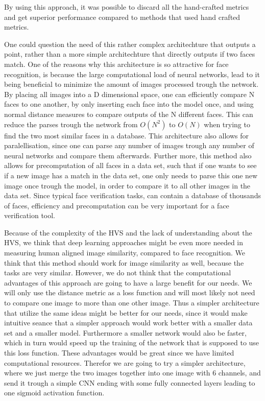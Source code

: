 By using this approach, it was possible to discard all the hand-crafted metrics and get superior performance compared to methods that used hand crafted metrics\cite{state_of_the_art}\cite{UltimateAccuracy}\cite{FaceNet}\cite{Deep_Face}.

One could question the need of this rather complex architechture that outputs a point, rather than a more simple architechture that directly outputs if two faces match. One of the reasons why this architecture is so attractive for face recognition, is because the large computational load of neural networks, lead to it being beneficial to minimize the amount of images processed trough the network. By placing all images into a D dimensional space, one can efficiently compare N faces to one another, by only inserting each face into the model once, and using normal distance measures to compare outputs of the N different faces\cite{FaceNet}. This can reduce the parses trough the network from $O(N^2)$ to $O(N)$ when trying to find the two most similar faces in a database. This architecture also allows for paralellisation, since one can parse any number of images trough any number of neural networks and compare them afterwards. Further more, this method also allows for precomputation of all faces in a data set, such that if one wants to see if a new image has a match in the data set, one only needs to parse this one new image once trough the model, in order to compare it to all other images in the data set\cite{FaceNet}\cite{Learning_Fine_grained}\cite{Learning_similarity_metric}. Since typical face verification tasks, can contain a database of thousands of faces, efficiency and precomputation can be very important for a face verification tool.

Because of the complexity of the HVS and the lack of understanding about the HVS\cite{msebad}, we think that deep learning approaches might be even more needed in measuring human aligned image similarity, compared to face recognition. We think that this method should work for image similarity as well, because the tasks are very similar. However, we do not think that the computational advantages of this approach are going to have a large benefit for our needs. We will only use the distance metric as a loss function and will most likely not need to compare one image to more than one other image. 
Thus a simpler architecture that utilize the same ideas might be better for our needs, since it would make intuitive seance that a simpler approach would work better with a smaller data set and a smaller model. Furthermore a smaller network would also be faster, which in turn would speed up the training of the network that is supposed to use this loss function. These advantages would be great since we have limited computational resources.  Therefor we are going to try a simpler architecture, where we just merge the two images together into one image with 6 channels, and send it trough a simple CNN ending with some fully connected layers leading to one sigmoid activation function. 

